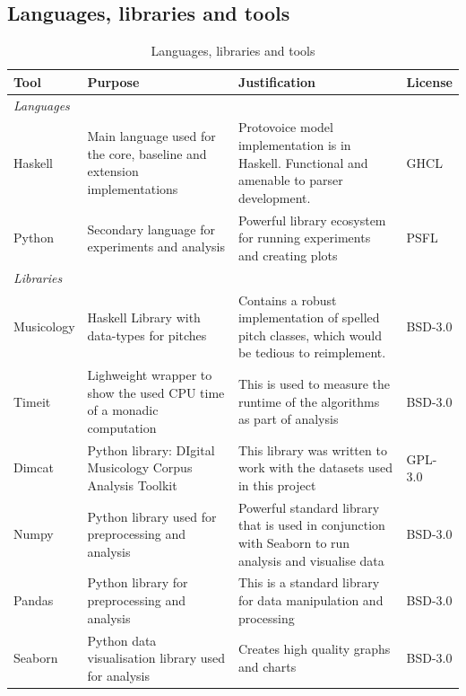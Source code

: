 \documentclass[12pt,a4paper,twoside,openany]{report} \usepackage[pdfborder={0 0 0}]{hyperref}    %
\theoremstyle{definition} \newtheorem{definition}{Definition}[section]
\begin{document}
\subsection{Languages, libraries and tools}
\label{sub:languagesLibrariesTools}

    \begin{table}[ht!] \caption{Languages, libraries and tools} \label{tab:languages} \centering \footnotesize
      \renewcommand{\arraystretch}{1.3} \begin{tabularx}{\textwidth}{p{4em}X X p{4em}} {\normalsize \textbf{Tool}}
      & {\normalsize \textbf{Purpose}} & {\normalsize\textbf{Justification}} & {\normalsize \textbf{License}} \\
        \toprule \textit{Languages} &&&\\ Haskell & Main language used for the core, baseline and extension
        implementations & Protovoice model implementation is in Haskell. Functional and amenable to parser development.
                        & GHCL \\

        Python & Secondary language for experiments and analysis & Powerful library ecosystem for running experiments
        and creating plots & PSFL \\

        \midrule \textit{Libraries} &&&\\ Musicology & Haskell Library with data-types for pitches & Contains a robust
        implementation of spelled pitch classes, which would be tedious to reimplement. & BSD-3.0 \\ Timeit & Lighweight
        wrapper to show the used CPU time of a monadic computation & This is used to measure the runtime of the algorithms
        as part of analysis & BSD-3.0 \\ Dimcat & Python library: DIgital Musicology Corpus Analysis Toolkit & This
        library was written to work with the datasets used in this project & GPL-3.0 \\ Numpy & Python library used for
        preprocessing and analysis & Powerful standard library that is used in conjunction with Seaborn to run analysis
        and visualise data & BSD-3.0 \\ Pandas & Python library for preprocessing and analysis & This is a standard
        library for data manipulation and processing & BSD-3.0 \\ Seaborn & Python data visualisation library used for
        analysis & Creates high quality graphs and charts & BSD-3.0 \\ \midrule


\end{tabularx}
\end{table}
\end{document}
